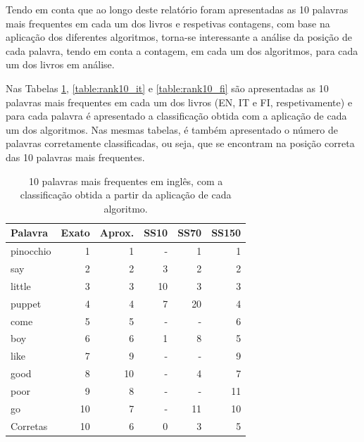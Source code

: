 \documentclass[mirror, portugues]{revdetua}
\begin{document}
Tendo em conta que ao longo deste relatório foram apresentadas as 10 palavras mais frequentes em cada um dos livros e respetivas contagens, com base na aplicação dos diferentes algoritmos, torna-se interessante a análise da posição de cada palavra, tendo em conta a contagem, em cada um dos algoritmos, para cada um dos livros em análise.

Nas Tabelas \ref{table:rank10_ing}, \ref{table:rank10_it} e \ref{table:rank10_fi} são apresentadas as 10 palavras mais frequentes em cada um dos livros (EN, IT e FI, respetivamente) e para cada palavra é apresentado a classificação obtida com a aplicação de cada um dos algoritmos. Nas mesmas tabelas, é também apresentado o número de palavras corretamente classificadas, ou seja, que se encontram na posição correta das 10 palavras mais frequentes.

\begin{table}[H]
\centering
\caption{10 palavras mais frequentes em inglês, com a classificação obtida a partir da aplicação de cada algoritmo.}
\label{table:rank10_ing}
\begin{tabular}{lrrrrr}
\toprule
Palavra & Exato & Aprox. & SS10 & SS70 & SS150 \\
\midrule
pinocchio & 1 & 1 & - & 1 & 1 \\
say & 2 & 2 & 3 & 2 & 2 \\
little & 3 & 3 & 10 & 3 & 3 \\
puppet & 4 & 4 & 7 & 20 & 4 \\
come & 5 & 5 & - & - & 6 \\
boy & 6 & 6 & 1 & 8 & 5 \\
like & 7 & 9 & - & - & 9 \\
good & 8 & 10 & - & 4 & 7 \\
poor & 9 & 8 & - & - & 11 \\
go & 10 & 7 & - & 11 & 10 \\
\midrule
Corretas & 10 & 6 & 0 & 3 & 5 \\
\bottomrule
\end{tabular}
\end{table}
\end{document}

